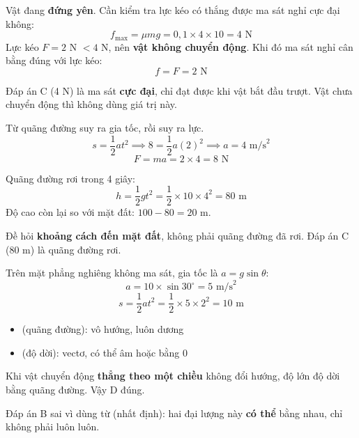 \documentclass[11pt, a4paper]{article}
\begin{document}
\begin{dapan}[3 — Đáp án A]
Vật đang \textbf{đứng yên}. Cần kiểm tra lực kéo có thắng được ma sát nghỉ cực đại không:
\[
f_{\max} = \mu mg = 0{,}1 \times 4 \times 10 = 4 \text{ N}
\]
Lực kéo $F = 2$ N $< 4$ N, nên \textbf{vật không chuyển động}. Khi đó ma sát nghỉ cân bằng đúng với lực kéo:
\[
f = F = 2 \text{ N}
\]

 Đáp án C (4 N) là ma sát \textbf{cực đại}, chỉ đạt được khi vật bắt đầu trượt. Vật chưa chuyển động thì không dùng giá trị này.
\end{dapan}

\begin{dapan}[4 — Đáp án C]
Từ quãng đường suy ra gia tốc, rồi suy ra lực.
\[
s = \frac{1}{2}at^2 \implies 8 = \frac{1}{2}a(2)^2 \implies a = 4 \text{ m/s}^2
\]
\[
F = ma = 2 \times 4 = 8 \text{ N}
\]
\end{dapan}

\begin{dapan}[5 — Đáp án D]
Quãng đường rơi trong 4 giây:
\[
h = \frac{1}{2}gt^2 = \frac{1}{2}\times 10 \times 4^2 = 80 \text{ m}
\]
Độ cao còn lại so với mặt đất: $100 - 80 = 20$ m.

 Đề hỏi \textbf{khoảng cách đến mặt đất}, không phải quãng đường đã rơi. Đáp án C (80 m) là quãng đường rơi.
\end{dapan}

\begin{dapan}[6 — Đáp án C]
Trên mặt phẳng nghiêng không ma sát, gia tốc là $a = g\sin\theta$:
\[
a = 10 \times \sin 30^\circ = 5 \text{ m/s}^2
\]
\[
s = \frac{1}{2}at^2 = \frac{1}{2}\times 5 \times 2^2 = 10 \text{ m}
\]
\end{dapan}

\begin{dapan}[7 — Đáp án D]
\begin{itemize}[leftmargin=1.4em, itemsep=2pt]
\item {} (quãng đường): vô hướng, luôn dương
\item {} (độ dời): vectơ, có thể âm hoặc bằng 0
\end{itemize}

Khi vật chuyển động \textbf{thẳng theo một chiều} không đổi hướng, độ lớn độ dời bằng quãng đường. Vậy D đúng.

 Đáp án B sai vì dùng từ  (nhất định): hai đại lượng này \textbf{có thể} bằng nhau, chỉ không phải luôn luôn.
\end{dapan}
\end{document}
